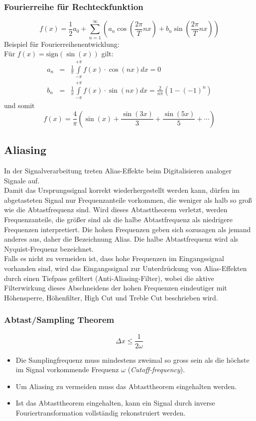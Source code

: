 \subsubsection*{Fourierreihe für Rechteckfunktion}
$$f(x) = \frac{1}{2} a_0 + \sum\limits_{n=1}^{\infty} \left( a_n \cos( \frac{2 \pi}{T} nx) + b_n \sin (\frac{2 \pi}{T} nx) \right)$$
Beispiel für Fourierreihenentwicklung: \\
Für $f(x) = \textrm{sign}(\sin(x))$ gilt:
\begin{eqnarray*}
a_n &=& \frac{1}{\pi} \int\limits_{- \pi}^{+ \pi} f(x) \cdot \cos(nx) dx = 0 \\
b_n &=& \frac{1}{\pi} \int\limits_{- \pi}^{+ \pi} f(x) \cdot \sin(nx) dx = \frac{2}{n \pi} (1 - (-1)^n)
\end{eqnarray*}
und somit $$f(x) = \frac{4}{\pi} \left( \sin(x) + \frac{\sin(3x)}{3} + \frac{\sin(5x)}{5} + \cdots \right)$$

\subsection{Aliasing}
In der Signalverarbeitung treten Alias-Effekte beim Digitalisieren analoger Signale auf. \\
Damit das Ursprungssignal korrekt wiederhergestellt werden kann, dürfen im abgetasteten Signal nur Frequenzanteile vorkommen, die weniger als halb so groß wie die Abtastfrequenz sind. Wird dieses Abtasttheorem verletzt, werden Frequenzanteile, die größer sind als die halbe Abtastfrequenz als niedrigere Frequenzen interpretiert. Die hohen Frequenzen geben sich sozusagen als jemand anderes aus, daher die Bezeichnung Alias. Die halbe Abtastfrequenz wird als Nyquist-Frequenz bezeichnet. \\
Falls es nicht zu vermeiden ist, dass hohe Frequenzen im Eingangssignal vorhanden sind, wird das Eingangssignal zur Unterdrückung von Alias-Effekten durch einen Tiefpass gefiltert (Anti-Aliasing-Filter), wobei die aktive Filterwirkung dieses Abschneidens der hohen Frequenzen eindeutiger mit Höhensperre, Höhenfilter, High Cut und Treble Cut beschrieben wird.

\subsubsection*{Abtast/Sampling Theorem}
$$\Delta x \leq \frac{1}{2 \omega}$$
\begin{itemize}
\item Die Samplingfrequenz muss mindestens zweimal so gross sein als die höchste im Signal vorkommende Frequenz $\omega$ (\textsl{Cutoff-frequency}).
\item Um Aliasing zu vermeiden muss das Abtasttheorem eingehalten werden.
\item Ist das Abtasttheorem eingehalten, kann ein Signal durch inverse Fouriertransformation vollständig rekonstruiert werden.
\end{itemize}

